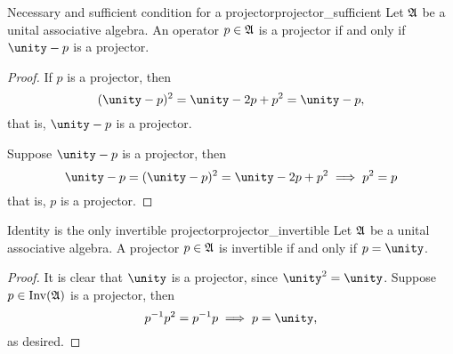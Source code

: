 \begin{proposition}{Necessary and sufficient condition for a projector}{projector_sufficient}
    Let \(\mathfrak{A}\) be a unital associative algebra. An operator \(p \in \mathfrak{A}\) is a projector if and only if \(\unity - p\) is a projector.
\end{proposition}
\begin{proof}
    If \(p\) is a projector, then
    \begin{equation*}
        (\unity - p)^2 = \unity - 2p + p^2  = \unity - p,
    \end{equation*}
    that is, \(\unity - p\) is a projector.

    Suppose \(\unity - p\) is a projector, then
    \begin{equation*}
        \unity - p=(\unity - p)^2 = \unity - 2p + p^2 \implies p^2 = p
    \end{equation*}
    that is, \(p\) is a projector.
\end{proof}
\begin{proposition}{Identity is the only invertible projector}{projector_invertible}
    Let \(\mathfrak{A}\) be a unital associative algebra. A projector \(p \in \mathfrak{A}\) is invertible if and only if \(p = \unity\).
\end{proposition}
\begin{proof}
    It is clear that \(\unity\) is a projector, since \(\unity^2 = \unity\). Suppose \(p \in \operatorname{Inv}(\mathfrak{A})\) is a projector, then
    \begin{equation*}
        p^{-1}p^2 = p^{-1}p \implies p = \unity,
    \end{equation*}
    as desired.
\end{proof}

